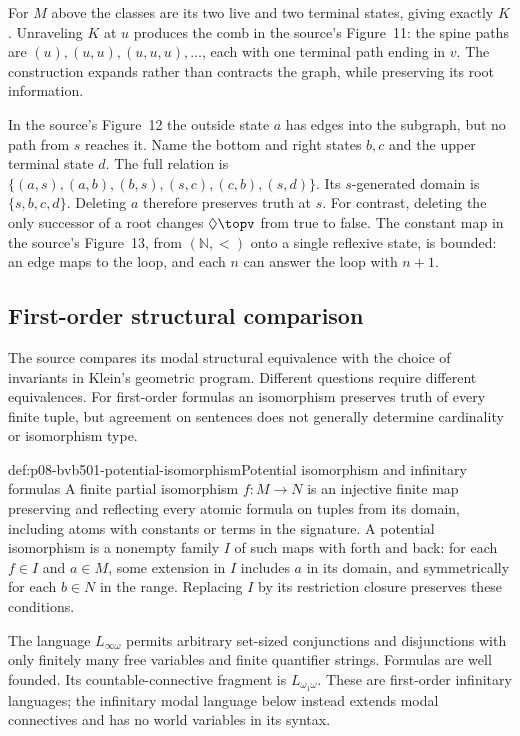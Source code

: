 For \(M\) above the classes are its two live and two terminal states,
giving exactly \(K\). Unraveling \(K\) at \(u\) produces the comb in
the source's Figure~11: the spine paths are \((u),(u,u),(u,u,u),\ldots\), each with
one terminal path ending in \(v\). The construction expands rather than
contracts the graph, while preserving its root information.

In the source's Figure~12 the outside state \(a\) has edges into the subgraph, but no
path from \(s\) reaches it. Name the bottom and right states \(b,c\)
and the upper terminal state \(d\). The full relation is
\(\{(a,s),(a,b),(b,s),(s,c),(c,b),(s,d)\}\).
Its \(s\)-generated domain is \(\{s,b,c,d\}\).
Deleting \(a\) therefore preserves truth at \(s\).
For contrast, deleting the only successor of a root changes
\(\Diamond\topv\) from true to false. The constant map in the source's Figure~13,
from \((\mathbb N,<)\) onto a single reflexive state, is bounded: an edge
maps to the loop, and each \(n\) can answer the loop with \(n+1\).

\subsection{First-order structural comparison}
\label{sec:p08-bvb501-first-order-comparison}

The source compares its modal structural equivalence with the choice of
invariants in Klein's geometric program. Different questions require
different equivalences. For first-order formulas an isomorphism preserves
truth of every finite tuple, but agreement on sentences does not generally
determine cardinality or isomorphism type.

\begin{hbdefinition}{def:p08-bvb501-potential-isomorphism}{Potential isomorphism and infinitary formulas}
A finite partial isomorphism \(f:M\to N\) is an injective finite map
preserving and reflecting every atomic formula on tuples from its domain,
including atoms with constants or terms in the signature. A potential
isomorphism is a nonempty family \(I\) of such maps with forth and back:
for each \(f\in I\) and \(a\in M\), some extension in \(I\)
includes \(a\) in its domain, and symmetrically for each \(b\in N\)
in the range. Replacing \(I\) by its restriction closure preserves these
conditions.

The language \(L_{\infty\omega}\) permits arbitrary set-sized
conjunctions and disjunctions with only finitely many free variables and
finite quantifier strings. Formulas are well founded. Its countable-connective
fragment is \(L_{\omega_1\omega}\). These are first-order infinitary
languages; the infinitary modal language below instead extends modal
connectives and has no world variables in its syntax.
\end{hbdefinition}

